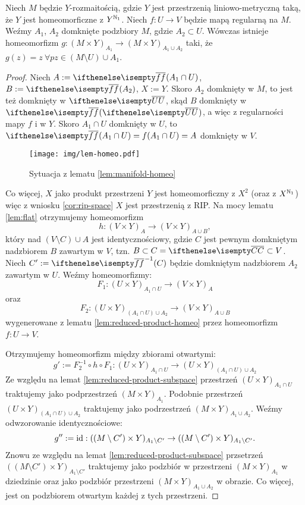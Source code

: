 \begin{lem} \label{lem:manifold-homeo}
  Niech $M$ będzie $Y$-rozmaitością, gdzie $Y$ jest przestrzenią liniowo-metryczną taką, że $Y$ jest homeomorficzne z $Y^{\mathbb{N}_1}$. Niech $f: U \to V$ będzie mapą regularną na $M$. Weźmy $A_1$, $A_2$ domknięte podzbiory $M$, gdzie $A_2 \subset U$. Wówczas istnieje homeomorfizm $g: (M\times Y)_{A_1} \to (M\times Y)_{A_1 \cup A_2}$ taki, że $g(z) = z\ \forall pz \in (M\setminus U) \cup A_1$.
  
  \begin{proof}
    Niech $A := \cl{f}(A_1 \cap U)$, $B := \cl{f}(A_2)$, $X := Y$. Skoro $A_2$ domknięty w $M$, to jest też domknięty w $\cl U$, skąd $B$ domknięty w $\cl{f}(\cl U)$, a więc z regularności mapy $f$ i w $Y$. Skoro $A_1 \cap U$ domknięty w $U$, to $\cl{f}(A_1 \cap U) = f(A_1 \cap U) = A$ domknięty w $V$.
    
    \begin{figure}[h!]
      \centering
      \texttt{[image: img/lem-homeo.pdf]}
      \caption{Sytuacja z lematu \ref{lem:manifold-homeo}}
    \end{figure}
    
    Co więcej, $X$ jako produkt przestrzeni $Y$ jest homeomorficzny z $X^2$ (oraz z $X^{\mathbb{N}_1}$) więc z wniosku \ref{cor:rip-space} $X$ jest przestrzenią z RIP. Na mocy lematu \ref{lem:flat} otrzymujemy homeomorfizm
    \[
      h: (V\times Y)_{A} \to (V\times Y)_{A\cup B},
    \]
    który nad $(V\setminus C)\cup A$ jest identycznościowy, gdzie $C$ jest pewnym domkniętym nadzbiorem $B$ zawartym w $V$, tzn. $B \subset C = \cl C \subset V$. Niech $C' := \cl{f}^{-1}(C)$ będzie domkniętym nadzbiorem $A_2$ zawartym w $U$.
    Weźmy homeomorfizmy:
    \[
      F_1: (U\times Y)_{A_1 \cap U} \to (V\times Y)_A
    \]
    oraz
    \[
      F_2: (U\times Y)_{(A_1 \cap U)\cup A_2} \to (V\times Y)_{A\cup B}
    \]
    wygenerowane z lematu \ref{lem:reduced-product-homeo} przez homeomorfizm $f: U\to V$.

    Otrzymujemy homeomorfizm między zbiorami otwartymi:
    \[
      g' := F_2^{-1} \circ h \circ F_1: (U\times Y)_{A_1 \cap U} \to (U\times Y)_{(A_1\cap U) \cup A_2}
    \]
    Ze względu na lemat \ref{lem:reduced-product-subspace} przestrzeń $(U\times Y)_{A_1 \cap U}$ traktujemy jako podprzestrzeń $(M\times Y)_{A_1}$. Podobnie przestrzeń $(U\times Y)_{(A_1\cap U)\cup A_2}$ traktujemy jako podrzestrzeń $(M\times Y)_{A_1\cup A_2}$.
    Weźmy odwzorowanie identycznościowe:
    \[
      g'' := \operatorname{id}: ((M\setminus C')\times Y)_{A_1\setminus C'} \to ((M\setminus C')\times Y)_{A_1\setminus C'}.
    \]
    Znowu ze względu na lemat \ref{lem:reduced-product-subspace} przsetrzeń $((M\setminus C')\times Y)_{A_1\setminus C'}$ traktujemy jako podzbiór w przestrzeni $(M\times Y)_{A_1}$ w dziedzinie oraz jako podzbiór przestrzeni $(M\times Y)_{A_1\cup A_2}$ w obrazie. Co więcej, jest on podzbiorem otwartym każdej z tych przestrzeni.
    

\end{proof}
\end{lem}
